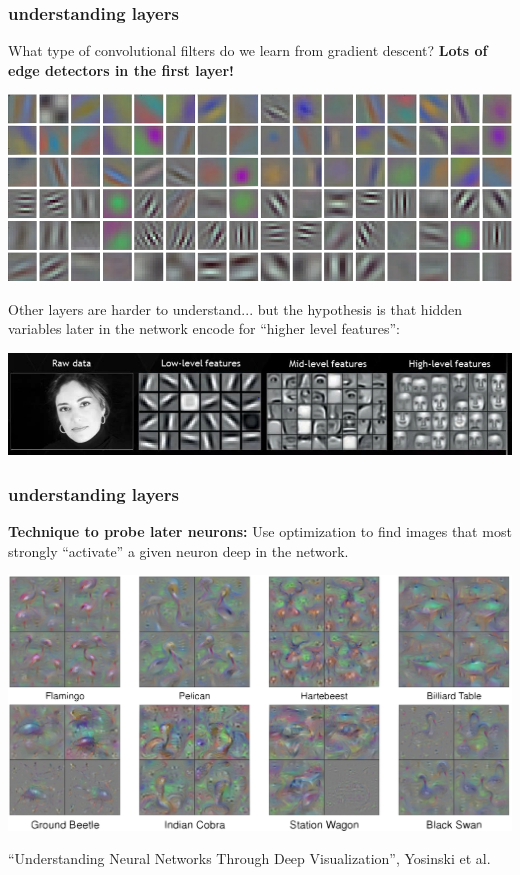 \documentclass[handout,compress]{beamer}
\begin{document}
\begin{frame}
	\frametitle{understanding layers}
	\small
	What type of convolutional filters do we learn from gradient descent? \textbf{Lots of edge detectors in the first layer!}
	\begin{center}
		\includegraphics[width=.6\textwidth]{first_layer.png}
	\end{center}
Other layers are harder to understand... but the hypothesis is that hidden variables later in the network encode for ``higher level features'':
	\begin{center}
	\includegraphics[width=\textwidth]{mid_level.png}
	\end{center}
\end{frame}

\begin{frame}
	\frametitle{understanding layers}\small
	\textbf{Technique to probe later neurons:} Use optimization to find images that most strongly ``activate'' a given neuron deep in the network. 
	
	\begin{center}
		\includegraphics[width=\textwidth]{clune_paper.png}
	\end{center}
	\footnotesize{``Understanding Neural Networks Through Deep Visualization'', Yosinski et al.}
\end{frame}
\end{document}
